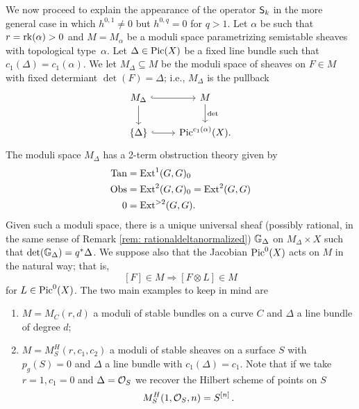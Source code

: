 \documentclass[a4paper, 12pt]{amsart}
\begin{document}
We now proceed to explain the appearance of the operator ${\mathsf{S}}_k$ in the more general case in which $h^{0, 1}\neq 0$ but $h^{0, q}=0$ for $q>1$. Let $\alpha$ be such that $r=\mathrm{rk}(\alpha)>0$ and $M=M_\alpha$ be a moduli space parametrizing semistable sheaves with topological type~$\alpha$. Let $\Delta\in \mathop{\rm Pic}\nolimits(X)$ be a fixed line bundle  such that $c_1(\Delta)=c_1(\alpha)$. We let $M_\Delta\subseteq M$ be the moduli space of sheaves on $F\in M$ with fixed determiant $\det(F)=\Delta$; i.e., $M_\Delta$ is the pullback
\begin{equation}\label{eq: cartesianpic}
\begin{tikzcd}
M_\Delta\arrow[r, hookrightarrow]\arrow[d]& M\arrow[d, "\det"]\\
\{\Delta\} \arrow[r, hookrightarrow]&
\Pic^{c_1(\alpha)}(X).
\end{tikzcd}
\end{equation}
The moduli space $M_\Delta$ has a 2-term obstruction theory given by 
\begin{align*}
\textup{Tan}&=\textup{Ext}^1(G,G)_0\\
\textup{Obs}&=\textup{Ext}^2(G,G)_0=\textup{Ext}^2(G, G)\\
0&=\textup{Ext}^{>2}(G,G).
\end{align*}
Given such a moduli space, there is a unique universal sheaf (possibly rational, in the same sense of Remark \ref{rem: rationaldeltanormalized}) ${\mathbb{G}}_\Delta$ on $M_\Delta\times X$ such that $\det({\mathbb{G}}_\Delta)=q^\ast \Delta$. 
We suppose also that the Jacobian $\mathop{\rm Pic}\nolimits^0(X)$ acts on $M$ in the natural way; that is,
\[[F]\in M\Rightarrow [F\otimes L]\in M\]
for $L\in \mathop{\rm Pic}\nolimits^0(X)$. The two main examples to keep in mind are
\begin{enumerate}
\item $M=M_C(r, d)$ a moduli of stable bundles on a curve $C$ and $\Delta$ a line bundle of degree $d$;
\item $M=M_S^H(r, c_1,c_2)$ a moduli of stable sheaves on a surface $S$ with $p_g(S)=0$ and $\Delta$ a line bundle with $c_1(\Delta)=c_1$. Note that if we take $r=1, c_1=0$ and $\Delta={\mathcal O}_S$ we recover the Hilbert scheme of points on $S$
\[M_S^H(1, {\mathcal O}_S, n)= S^{[n]}\,.\]
\end{enumerate}
\end{document}
